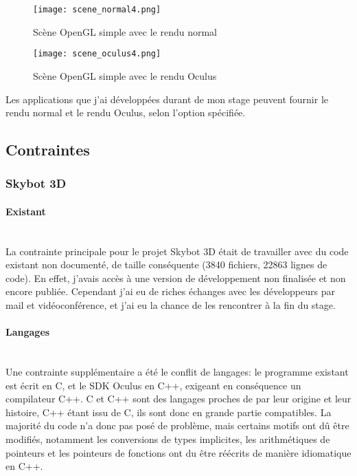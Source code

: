\documentclass[a4paper,french,12pt]{article}
\begin{document}
			    \begin{figure}
			      \centering
				\texttt{[image: scene\_normal4.png]}
			      \caption{Scène OpenGL simple avec le rendu normal}

				\texttt{[image: scene\_oculus4.png]}
			      \caption{Scène OpenGL simple avec le rendu Oculus}
			    \end{figure}
			    \clearpage

			    \FloatBarrier

			    Les applications que j'ai développées durant de mon stage peuvent fournir le rendu normal
			    et le rendu Oculus, selon l'option spécifiée.


	\subsection{Contraintes}

	\subsubsection{Skybot 3D}
	    \paragraph{Existant} ~\\

		La contrainte principale pour le projet Skybot 3D était de travailler avec du code existant non documenté,
		de taille conséquente (3840 fichiers, 22863 lignes de code).
		En effet, j'avais accès à une version de développement non finalisée et non encore publiée. Cependant j'ai
		eu de riches échanges avec les développeurs par mail et vidéoconférence, et j'ai eu la chance
		de les rencontrer à la fin du stage.

	    \paragraph{Langages} ~\\

		Une contrainte supplémentaire a été le conflit de langages: le programme existant est écrit en C, et le
		SDK Oculus en C++, exigeant en conséquence un compilateur C++.
		C et C++ sont des langages proches de par leur origine et leur histoire, C++ étant issu de C,
		ils sont donc en grande partie compatibles. La majorité du code n'a donc pas posé de problème,
		mais certains motifs ont dû être modifiés, notamment les conversions de types implicites,
		les arithmétiques de pointeurs et les pointeurs de fonctions ont du être réécrits de manière
		idiomatique en C++.
\end{document}
